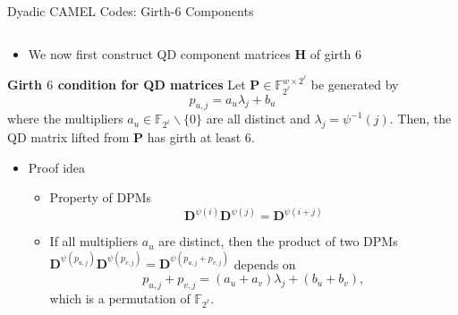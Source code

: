 \documentclass[10pt, aspectratio=169]{beamer}
\newcommand{\bH}{\mathbf{H}}
\newcommand{\bP}{\mathbf{P}}
\newcommand{\bD}{\mathbf{D}}
\newcommand{\Fq}{\mathbb{F}_{2^\ell}}
\begin{document}
\begin{frame}[c]{Dyadic CAMEL Codes: Girth-6 Components}
  \begin{columns}[T,onlytextwidth]
    \begin{column}{\textwidth}
      \begin{itemize}
        \item We now first construct QD component matrices \(\bH\)
        of girth $6$
      \end{itemize}
        \begin{center}
          \begin{minipage}{0.89\textwidth}
            \begin{theobox}{\textbf{Girth $6$ condition for QD matrices}}{
              Let $\bP\in\Fq^{w\times 2^\ell}$ be generated by
              \[
                p_{u,j}=a_u\lambda_j+b_u
              \]
              where the multipliers $a_u\in\Fq\backslash\{0\}$ are all distinct and $\lambda_j = \psi^{-1} (j)$. Then, the QD matrix lifted from $\bP$ has girth at least $6$.}
            \end{theobox}
          \end{minipage}
        \end{center}
\vspace{-1em}
        \begin{itemize}
          \item Proof idea
          \begin{itemize}
            \item Property of DPMs
            \[ \bD^{\psi(i)}\bD^{\psi(j)}=\bD^{\psi(i + j)}\]
            \item If all multipliers $a_u$ are distinct, then the product of two DPMs $\bD^{\psi(p_{u,j})}\bD^{\psi(p_{v,j})}=\bD^{\psi(p_{u,j} + p_{v,j})}$ depends on
            \[
              p_{u,j}+p_{v,j}
              =(a_u+a_v)\lambda_j+(b_u+b_v),
            \]
            which is a permutation of $\Fq$.

          \end{itemize}

        \end{itemize}



%
    \end{column}
  \end{columns}
\end{frame}
\end{document}
